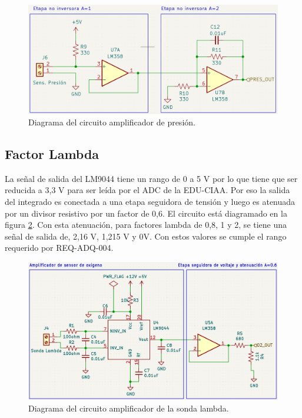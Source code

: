 \begin{figure}[htpb]
\centering
\includegraphics[width=\textwidth]{./Figures/circuito-presion.png}
\caption{Diagrama del circuito amplificador de presión.}
\label{fig:circuito-presion}
\end{figure}

\subsection{Factor Lambda}

La señal de salida del LM9044 tiene un rango de 0 a 5 V por lo que tiene que ser reducida a 3,3 V para ser leída por el ADC de la EDU-CIAA. Por eso la salida del integrado es conectada a una etapa seguidora de tensión y luego es atenuada por un divisor resistivo por un factor de 0,6. El circuito está diagramado en la figura \ref{fig:circuito-o2}. Con esta atenuación, para factores lambda de 0,8, 1 y 2, se tiene una señal de salida de, 2,16 V, 1,215 V y 0V. Con estos valores se cumple el rango requerido por REQ-ADQ-004.

\begin{figure}[htpb]
\centering
\includegraphics[width=\textwidth]{./Figures/ampli-o2.png}
\caption{Diagrama del circuito amplificador de la sonda lambda.}
\label{fig:circuito-o2}
\end{figure}

